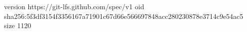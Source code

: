 version https://git-lfs.github.com/spec/v1
oid sha256:5f3df3154f3356167a71901c67d66e566697848acc280230878e3714c9e54ac5
size 1120
